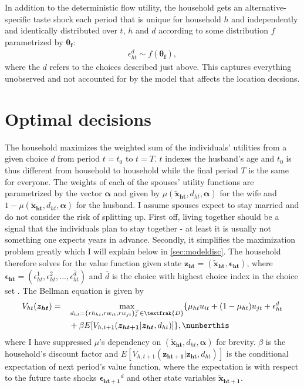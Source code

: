 In addition to the deterministic flow utility, the household gets an alternative-specific taste shock each period that is unique for household $h$ and independently and identically distributed over $t$, $h$ and $d$ according to some distribution $f$ parametrized by $\boldsymbol{\theta_f}$:
\begin{align}
\epsilon_{ht}^d \sim f(\boldsymbol{\theta_f}),
\label{eq:shock}
\end{align}
where the $d$ refers to the choices described just above. This captures everything unobserved and not accounted for by the model that affects the location decsions.

\section{Optimal decisions}
The household maximizes the weighted sum of the individuals' utilities from a given choice $d$ from period $t=t_0$ to $t=T$. $t$ indexes the husband's age and $t_0$ is thus different from household to household while the final period $T$ is the same for everyone. The weights of each of the spouses' utility functions are parametrized by the vector $\boldsymbol{\alpha}$ and given by $\mu(\boldsymbol{\tilde{x}_{ht}},d_{ht},\boldsymbol{\alpha})$ for the wife and $1-\mu(\boldsymbol{\tilde{x}_{ht}},d_{ht},\boldsymbol{\alpha})$ for the husband. I assume spouses expect to stay married and do not consider the risk of splitting up. First off, living together should be a signal that the individuals plan to stay together - at least it is usually not something one expects years in advance. Secondly, it simplifies the maximization problem greatly which I will explain below in \autoref{sec:modeldisc}. The household therefore solves for the value function given state $\boldsymbol{z_{ht}}=(\boldsymbol{\tilde{x}_{ht}},\boldsymbol{\epsilon_{ht}})$, where $\boldsymbol{\epsilon_{ht}}=(\epsilon_{ht}^1,\epsilon_{ht}^2,...,\epsilon_{ht}^{\bar{d}})$ and $\bar{d}$ is the choice with highest choice index in the choice set . The Bellman equation is given by
\begin{alignat*}{3}
&V_{ht}(\boldsymbol{z_{ht}})=&&\max_{d_{ht}=\{rh_{ht},rw_{it},rw_{jt}\}_t^T\in \textfrak{D}} \{\mu_{ht} u_{it}+(1-\mu_{ht})u_{jt}+\epsilon_{ht}^d \\
& &&+\beta E[V_{h,t+1}(\boldsymbol{z_{ht+1}}|\boldsymbol{z_{ht}},d_{ht})]\}, \numberthis
\label{eq:Vh}
\end{alignat*}
where I have suppressed $\mu$'s dependency on $(\boldsymbol{\tilde{x}_{ht}},d_{ht},\boldsymbol{\alpha})$ for brevity. $\beta$ is the household's discount factor and $E[V_{h,t+1}(\boldsymbol{z_{ht+1}}|\boldsymbol{z_{ht}},d_{ht})]$ is the conditional expectation of next period's value function, where the expectation is with respect to the future taste shocks $\boldsymbol{\epsilon_{ht+1}}^d$ and other state variables $\boldsymbol{\tilde{x}_{ht+1}}$.

